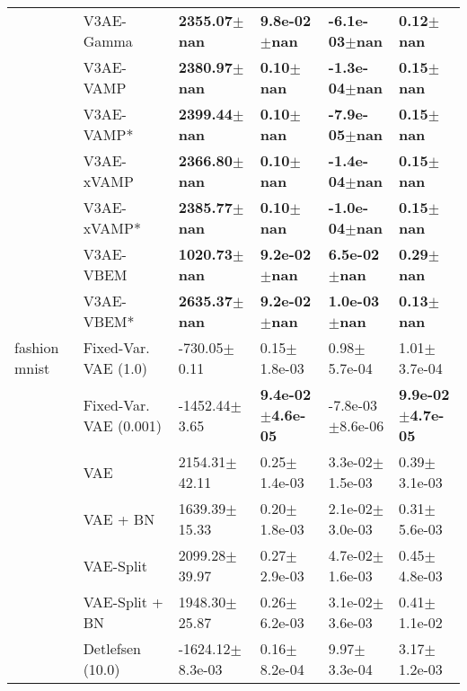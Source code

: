 \begin{tabular}{llllll}
             & V3AE-Gamma &     \textbf{2355.07$\pm$nan} &      \textbf{9.8e-02$\pm$nan} &     \textbf{-6.1e-03$\pm$nan} &         \textbf{0.12$\pm$nan} \\
             & V3AE-VAMP &     \textbf{2380.97$\pm$nan} &         \textbf{0.10$\pm$nan} &     \textbf{-1.3e-04$\pm$nan} &         \textbf{0.15$\pm$nan} \\
             & V3AE-VAMP* &     \textbf{2399.44$\pm$nan} &         \textbf{0.10$\pm$nan} &     \textbf{-7.9e-05$\pm$nan} &         \textbf{0.15$\pm$nan} \\
             & V3AE-xVAMP &     \textbf{2366.80$\pm$nan} &         \textbf{0.10$\pm$nan} &     \textbf{-1.4e-04$\pm$nan} &         \textbf{0.15$\pm$nan} \\
             & V3AE-xVAMP* &     \textbf{2385.77$\pm$nan} &         \textbf{0.10$\pm$nan} &     \textbf{-1.0e-04$\pm$nan} &         \textbf{0.15$\pm$nan} \\
             & V3AE-VBEM &     \textbf{1020.73$\pm$nan} &      \textbf{9.2e-02$\pm$nan} &      \textbf{6.5e-02$\pm$nan} &         \textbf{0.29$\pm$nan} \\
             & V3AE-VBEM* &     \textbf{2635.37$\pm$nan} &      \textbf{9.2e-02$\pm$nan} &      \textbf{1.0e-03$\pm$nan} &         \textbf{0.13$\pm$nan} \\
fashion mnist & Fixed-Var. VAE (1.0) &             -730.05$\pm$0.11 &              0.15$\pm$1.8e-03 &              0.98$\pm$5.7e-04 &              1.01$\pm$3.7e-04 \\
             & Fixed-Var. VAE (0.001) &            -1452.44$\pm$3.65 &  \textbf{9.4e-02$\pm$4.6e-05} &          -7.8e-03$\pm$8.6e-06 &  \textbf{9.9e-02$\pm$4.7e-05} \\
             & VAE &            2154.31$\pm$42.11 &              0.25$\pm$1.4e-03 &           3.3e-02$\pm$1.5e-03 &              0.39$\pm$3.1e-03 \\
             & VAE + BN &            1639.39$\pm$15.33 &              0.20$\pm$1.8e-03 &           2.1e-02$\pm$3.0e-03 &              0.31$\pm$5.6e-03 \\
             & VAE-Split &            2099.28$\pm$39.97 &              0.27$\pm$2.9e-03 &           4.7e-02$\pm$1.6e-03 &              0.45$\pm$4.8e-03 \\
             & VAE-Split + BN &            1948.30$\pm$25.87 &              0.26$\pm$6.2e-03 &           3.1e-02$\pm$3.6e-03 &              0.41$\pm$1.1e-02 \\
             & Detlefsen (10.0) &         -1624.12$\pm$8.3e-03 &              0.16$\pm$8.2e-04 &              9.97$\pm$3.3e-04 &              3.17$\pm$1.2e-03 \\

\end{tabular}
